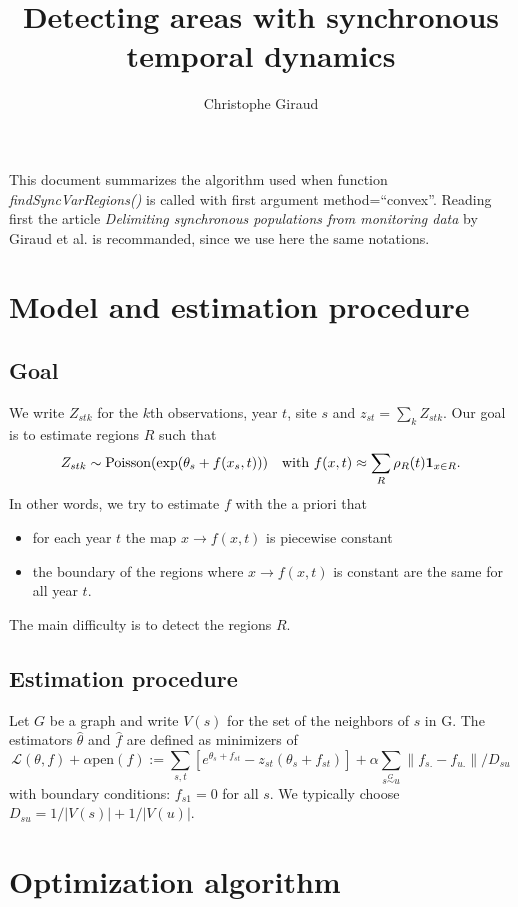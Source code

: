 \documentclass{article}
\title{\bf Detecting areas with synchronous temporal dynamics}
\author{Christophe Giraud}
\def\pen{\textrm{pen}}
\begin{document}
\maketitle

\noindent This document summarizes the algorithm used when function \textit{findSyncVarRegions()} is called with first argument method=``convex''. Reading first the article \emph{Delimiting synchronous populations from monitoring data} by Giraud et al. is recommanded, since we use here the same notations.

\section{Model and estimation procedure}

\subsection{Goal}

We write $Z_{stk}$ for the $k$th observations, year $t$, site $s$ and $z_{st}=\sum_{k}Z_{stk}$.
Our goal is to estimate regions $R$ such that
\begin{equation}\label{model}
Z_{stk}\sim \textrm{Poisson}(\exp(\theta_{s}+f(x_{s},t)))\quad\textrm{with } f(x,t)\approx \sum_{R}\rho_{R}(t){\bf 1}_{x\in R}.
\end{equation}
 In other words, we try to estimate $f$ with the a priori that
\begin{itemize}
\item for each year $t$ the map $x \to f(x,t)$ is piecewise constant
\item the boundary of the regions where $x \to f(x,t)$ is constant are the same for all year $t$.
\end{itemize}
The main difficulty is to detect the regions $R$.

\subsection{Estimation procedure}
Let $G$ be a graph and write $V(s)$ for the set of the neighbors of $s$ in G.
The estimators $\widehat \theta$ and $\widehat f$ are defined as minimizers of 
$$\mathcal{L}(\theta,f)+\alpha \pen(f):=\sum_{s,t}[e^{\theta_{s}+f_{st}}-z_{st}(\theta_{s}+f_{st})]+\alpha
\sum_{s\stackrel{G}{\sim}u}\|f_{s.}-f_{u.}\|/D_{su}$$
with boundary conditions: $f_{s1}=0$ for all $s$. We typically choose $D_{su}=1/|V(s)|+1/|V(u)|$.
 
\section{Optimization algorithm}
\end{document}
